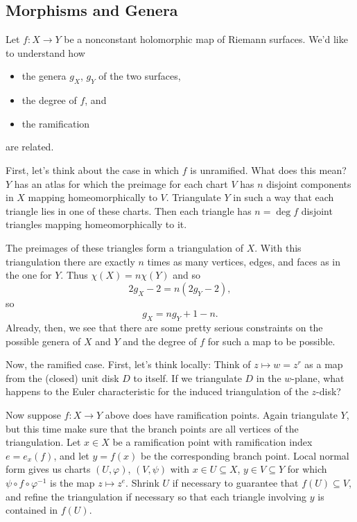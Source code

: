 \documentclass[12pt]{article}
\newcommand\inv[1]{#1^{-1}}
\theoremstyle{definition}
\theoremstyle{remark}
\begin{document}
\subsection{Morphisms and Genera}
Let $f : X \to Y$ be a nonconstant holomorphic map of Riemann surfaces. We'd like to understand how
\begin{itemize}
    \item the genera $g_X$, $g_Y$ of the two surfaces,
    \item the degree of $f$, and 
    \item the ramification
\end{itemize}
are related.

First, let's think about the case in which $f$ is unramified. What does this mean? $Y$ has an atlas for which the preimage for each chart $V$ has $n$ disjoint components in $X$ mapping homeomorphically to $V$. Triangulate $Y$ in such a way that each triangle lies in one of these charts. Then each triangle has $n = \deg f$ disjoint triangles mapping homeomorphically to it.

The preimages of these triangles form a triangulation of $X$. With this triangulation there are exactly $n$ times as many vertices, edges, and faces as in the one for $Y$. Thus $\chi(X) = n \chi(Y)$ and so 
\begin{equation}
    2 g_X - 2 = n (2g_Y - 2),
\end{equation}
so 
\begin{equation}
    g_X = n g_Y + 1 - n.
\end{equation}
Already, then, we see that there are some pretty serious constraints on the possible genera of $X$ and $Y$ and the degree of $f$ for such a map to be possible.

Now, the ramified case. First, let's think locally: Think of $z \mapsto w = z^r$ as a map from the (closed) unit disk $D$ to itself. If we triangulate $D$ in the $w$-plane, what happens to the Euler characteristic for the induced triangulation of the $z$-disk? 

Now suppose $f : X \to Y$ above does have ramification points. Again triangulate $Y$, but this time make sure that the branch points are all vertices of the triangulation. Let $x \in X$ be a ramification point with ramification index $e = e_x(f)$, and let $y = f(x)$ be the corresponding branch point. Local normal form gives us charts $(U, \varphi)$, $(V, \psi)$ with $x \in U \subseteq X$, $y \in V \subseteq Y$ for which $\psi \circ f \circ \inv{\varphi}$ is the map $z \mapsto z^e$. Shrink $U$ if necessary to guarantee that $f(U) \subseteq V$, and refine the triangulation if necessary so that each triangle involving $y$ is contained in $f(U)$.
\end{document}
